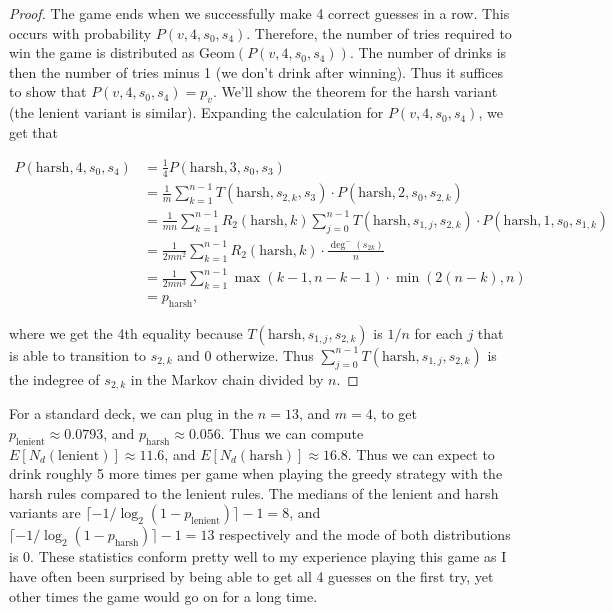 \documentclass[12pt]{article}
\newcommand{\Geom}{\text{Geom}}
\theoremstyle{definition}
\begin{document}
\begin{proof}
    The game ends when we successfully make 4 correct guesses in a row. This occurs with probability $P(v, 4, s_0, s_4)$. Therefore, the number of tries required to win the game is distributed as $\Geom(P(v, 4, s_0, s_4))$. The number of drinks is then the number of tries minus 1 (we don't drink after winning). Thus it suffices to show that $P(v, 4, s_0, s_4) = p_{v}$. We'll show the theorem for the harsh variant (the lenient variant is similar). Expanding the calculation for $P(v, 4, s_0, s_4)$, we get that

    \begin{align*}
    P(\text{harsh}, 4, s_0, s_4) &=  \frac{1}{4}P(\text{harsh}, 3, s_0, s_3)\\
    &=  \frac{1}{m}\sum_{k=1}^{n-1} T(\text{harsh}, s_{2, k}, s_3)\cdot P(\text{harsh}, 2, s_0, s_{2, k})\\
    &=  \frac{1}{mn}\sum_{k=1}^{n-1} R_2(\text{harsh}, k)\sum_{j=0}^{n-1}T(\text{harsh}, s_{1,j}, s_{2, k}) \cdot P(\text{harsh}, 1, s_0, s_{1, k})\\
    &=  \frac{1}{2mn^2}\sum_{k=1}^{n-1} R_2(\text{harsh}, k)\cdot \frac{\deg^-(s_{2k})}{n}\\
    &=  \frac{1}{2mn^3}\sum_{k=1}^{n-1} \max(k-1, n-k-1)\cdot \min(2(n-k), n)\\
    &=  p_{\text{harsh}},
    \end{align*}

    where we get the 4th equality because $T(\text{harsh}, s_{1,j}, s_{2, k})$ is $1/n$ for each $j$ that is able to transition to $s_{2, k}$ and $0$ otherwize. Thus $\sum_{j=0}^{n-1}T(\text{harsh}, s_{1,j}, s_{2, k})$ is the indegree of $s_{2, k}$ in the Markov chain divided by $n$.


\end{proof}

For a standard deck, we can plug in the $n=13$, and $m=4$, to get $p_\text{lenient} \approx 0.0793$, and $p_{\text{harsh}} \approx 0.056$. Thus we can compute $E[N_d(\text{lenient})] \approx 11.6$, and $E[N_d(\text{harsh})] \approx 16.8$. Thus we can expect to drink roughly 5 more times per game when playing the greedy strategy with the harsh rules compared to the lenient rules. The medians of the lenient and harsh variants are $\lceil -1/\log_2(1-p_\text{lenient}) \rceil - 1 = 8$, and  $\lceil -1/\log_2(1-p_\text{harsh}) \rceil - 1 = 13$ respectively and the mode of both distributions is $0$. These statistics conform pretty well to my experience playing this game as I have often been surprised by being able to get all 4 guesses on the first try, yet other times the game would go on for a long time.
\end{document}
